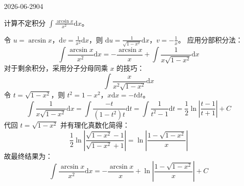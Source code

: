\begin{mistake}{2026-06-29}{04}

\begin{problemcontent}
计算不定积分 \(\int \frac{\arcsin x}{x^2} \mathrm{d}x\)。
\end{problemcontent}

\begin{solutioncontent}
令 \(u = \arcsin x\)，\(\mathrm{d}v = \frac{1}{x^2} \mathrm{d}x\)，则 \(\mathrm{d}u = \frac{1}{\sqrt{1-x^2}} \mathrm{d}x\)，\(v = -\frac{1}{x}\)。
应用分部积分法：
\[
\int \frac{\arcsin x}{x^2} \mathrm{d}x = -\frac{\arcsin x}{x} + \int \frac{1}{x\sqrt{1-x^2}} \mathrm{d}x
\]
对于剩余积分，采用分子分母同乘 \(x\) 的技巧：
\[
\int \frac{x}{x^2\sqrt{1-x^2}} \mathrm{d}x
\]
令 \(t = \sqrt{1-x^2}\)，则 \(t^2 = 1 - x^2\)，\(x \mathrm{d}x = -t \mathrm{d}t\)。
\[
\int \frac{1}{x\sqrt{1-x^2}} \mathrm{d}x = \int \frac{-t}{(1-t^2)t} \mathrm{d}t = \int \frac{1}{t^2-1} \mathrm{d}t = \frac{1}{2}\ln\left|\frac{t-1}{t+1}\right| + C
\]
代回 \(t = \sqrt{1-x^2}\) 并有理化真数化简得：
\[
\frac{1}{2}\ln\left|\frac{\sqrt{1-x^2}-1}{\sqrt{1-x^2}+1}\right| = \ln\left|\frac{1-\sqrt{1-x^2}}{x}\right|
\]
故最终结果为：
\[
\int \frac{\arcsin x}{x^2} \mathrm{d}x = -\frac{\arcsin x}{x} + \ln\left|\frac{1-\sqrt{1-x^2}}{x}\right| + C
\]
\end{solutioncontent}


\end{mistake}
